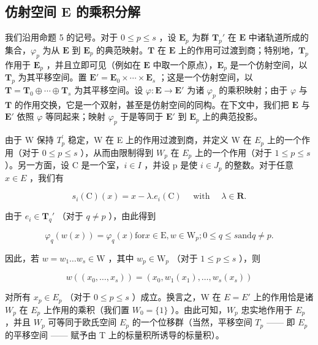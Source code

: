 \subsection{仿射空间 E 的乘积分解}

我们沿用命题 5 的记号。对于 \(0 \leqslant p \leqslant s\) ，设 \(\mathbf{E}_p\) 为群 \(\mathbf{T}_p'\) 在 \(\mathbf{E}\) 中诸轨道所成的集合，\(\varphi_p\) 为从 \(\mathbf{E}\) 到 \(\mathbf{E}_p\) 的典范映射。\(\mathbf{T}\) 在 \(\mathbf{E}\) 上的作用可过渡到商；特别地，\(\mathbf{T}_p\) 作用于 \(\mathbf{E}_p\) ，并且立即可见（例如在 \(\mathbf{E}\) 中取一个原点），\(\mathbf{E}_p\) 是一个仿射空间，以 \(\mathbf{T}_p\) 为其平移空间。置 \(\mathbf{E}' = \mathbf{E}_0 \times \cdots \times \mathbf{E}_s\) ；这是一个仿射空间，以 \(\mathbf{T} = \mathbf{T}_0 \oplus \cdots \oplus \mathbf{T}_s\) 为其平移空间。设 \(\varphi : \mathbf{E} \to \mathbf{E}'\) 为诸 \(\varphi_p\) 的乘积映射；由于 \(\varphi\) 与 \(\mathbf{T}\) 的作用交换，它是一个双射，甚至是仿射空间的同构。在下文中，我们把 \(\mathbf{E}\) 与 \(\mathbf{E}'\) 依照 \(\varphi\) 等同起来；映射 \(\varphi_p\) 于是等同于 \(\mathbf{E}'\) 到 \(\mathbf{E}_p\) 上的典范投影。

由于 W 保持 \(T_{p}^{\prime}\) 稳定，W 在 E 上的作用过渡到商，并定义 W 在 \(E_{p}\) 上的一个作用（对于 \(0 \leqslant p \leqslant s\) ），从而由限制得到 \(W_{p}\) 在 \(E_{p}\) 上的一个作用（对于 \(1 \leqslant p \leqslant s\) ）。另一方面，设 C 是一个室，\(i \in I\) ，并设 p 是使 \(i \in J_{p}\) 的整数。对于任意 \(x \in E\) ，我们有

\[
s _ {i} (\mathrm{C}) (x) = x - \lambda . e _ {i} (\mathrm{C}) \quad \text { with } \quad \lambda \in \mathbf {R}.
\]

由于 \(e_i \in \mathbf{T}_q'\) （对于 \(q \neq p\) ），由此得到

\[
\varphi_ {q} (w (x)) = \varphi_ {q} (x) \text {for} x \in \mathrm{E}, w \in \mathrm{W} _ {p}; 0 \leqslant q \leqslant s \text {and} q \neq p.
\]

因此，若 \(w = w_{1} \ldots w_{s} \in \mathrm{W}\) ，其中 \(w_{p} \in \mathrm{W}_{p}\) （对于 \(1 \leqslant p \leqslant s\) ），则

\[
w \left(\left(x _ {0}, \dots , x _ {s}\right)\right) = \left(x _ {0}, w _ {1} \left(x _ {1}\right), \dots , w _ {s} \left(x _ {s}\right)\right)\tag{5}
\]

对所有 \(x_{p} \in E_{p}\) （对于 \(0 \leqslant p \leqslant s\) ）成立。换言之，W 在 \(E = E'\) 上的作用恰是诸 \(W_{p}\) 在 \(E_{p}\) 上作用的乘积（我们置 \(W_{0} = \{1\}\) ）。由此可知，\(W_{p}\) 忠实地作用于 \(E_{p}\) ，并且 \(W_{p}\) 可等同于欧氏空间 \(E_{p}\) 的一个位移群（当然，平移空间 \(T_{p}\) —— 即 \(E_{p}\) 的平移空间 —— 赋予由 T 上的标量积所诱导的标量积）。

